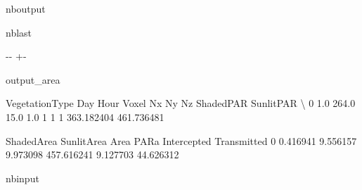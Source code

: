 \documentclass[letterpaper,10pt,english]{sphinxmanual}
\begin{document}
\begin{sphinxuseclass}{nboutput}
\begin{sphinxuseclass}{nblast}
{

\kern-\sphinxverbatimsmallskipamount\kern-\baselineskip
\kern+\FrameHeightAdjust\kern-\fboxrule
\vspace{\nbsphinxcodecellspacing}

\begin{sphinxuseclass}{output_area}
\begin{sphinxuseclass}{}


\begin{sphinxVerbatim}[commandchars=\\\{\}]
   VegetationType    Day  Hour  Voxel  Nx  Ny  Nz   ShadedPAR   SunlitPAR  \textbackslash{}
0             1.0  264.0  15.0    1.0   1   1   1  363.182404  461.736481

   ShadedArea  SunlitArea      Area        PARa  Intercepted  Transmitted
0    0.416941    9.556157  9.973098  457.616241     9.127703    44.626312
\end{sphinxVerbatim}



\end{sphinxuseclass}
\end{sphinxuseclass}
}

\end{sphinxuseclass}
\end{sphinxuseclass}
\begin{sphinxuseclass}{nbinput}
{
\begin{sphinxVerbatim}[commandchars=\\\{\}]
\llap{\color{nbsphinxin}[12]:\,\hspace{\fboxrule}\hspace{\fboxsep}}
\end{sphinxVerbatim}
}

\end{sphinxuseclass}
\end{document}
